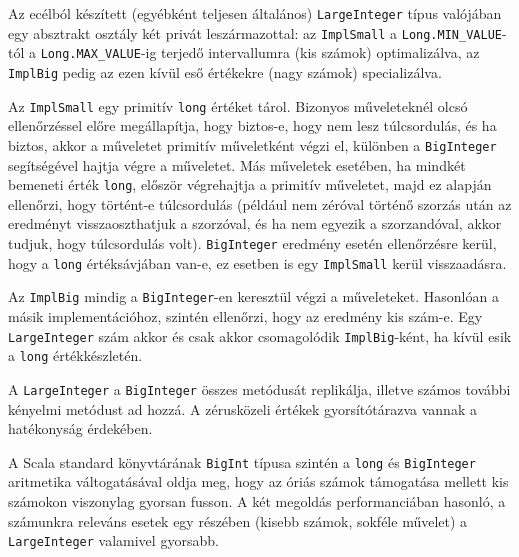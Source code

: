 \documentclass[
    parspace,
    noindent,
    nohyp,
]{elteiktdk}[2023/04/10]
\begin{document}
Az ecélból készített (egyébként teljesen általános) \texttt{LargeInteger} típus
valójában egy absztrakt osztály két privát leszármazottal:
az \texttt{ImplSmall} a \texttt{Long.MIN\_VALUE}-tól a \texttt{Long.MAX\_VALUE}-ig
terjedő intervallumra (kis számok) optimalizálva,
az \texttt{ImplBig} pedig az ezen kívül eső értékekre (nagy számok) specializálva.

Az \texttt{ImplSmall} egy primitív \texttt{long} értéket tárol.
Bizonyos műveleteknél olcsó ellenőrzéssel előre megállapítja,
hogy biztos-e, hogy nem lesz túlcsordulás,
és ha biztos, akkor a műveletet primitív műveletként végzi el,
különben a \texttt{BigInteger} segítségével hajtja végre a műveletet.
Más műveletek esetében, ha mindkét bemeneti érték \texttt{long},
először végrehajtja a primitív műveletet,
majd ez alapján ellenőrzi, hogy történt-e túlcsordulás
(például nem zéróval történő szorzás után az eredményt visszaoszthatjuk a szorzóval,
és ha nem egyezik a szorzandóval, akkor tudjuk, hogy túlcsordulás volt).
\texttt{BigInteger} eredmény esetén ellenőrzésre kerül,
hogy a \texttt{long} értéksávjában van-e,
ez esetben is egy \texttt{ImplSmall} kerül visszaadásra.

Az \texttt{ImplBig} mindig a \texttt{BigInteger}-en keresztül végzi a műveleteket.
Hasonlóan a másik implementációhoz, szintén ellenőrzi, hogy az eredmény kis szám-e.
Egy \texttt{LargeInteger} szám akkor és csak akkor csomagolódik \texttt{ImplBig}-ként,
ha kívül esik a \texttt{long} értékkészletén.

A \texttt{LargeInteger} a \texttt{BigInteger} összes metódusát replikálja,
illetve számos további kényelmi metódust ad hozzá.
A zérusközeli értékek gyorsítótárazva vannak a hatékonyság érdekében.

A Scala standard könyvtárának \texttt{BigInt} típusa szintén a \texttt{long} és \texttt{BigInteger}
aritmetika váltogatásával oldja meg,
hogy az óriás számok támogatása mellett kis számokon viszonylag gyorsan fusson.\cite{Rosset2019ScalaBigInt}
A két megoldás performanciában hasonló,
a számunkra releváns esetek egy részében (kisebb számok, sokféle művelet)
a \texttt{LargeInteger} valamivel gyorsabb.
\end{document}
